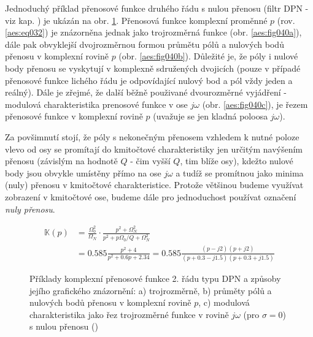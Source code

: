         Jednoduchý příklad přenosové funkce druhého řádu s nulou přenosu (filtr DPN - viz kap.
        ) je ukázán na obr. \ref{aes:fig040}. Přenosová funkce
        komplexní proměnné \(p\) (rov. \ref{aes:eq032}) je znázorněna jednak jako trojrozměrná
        funkce (obr. \ref{aes:fig040a}), dále pak obvyklejší dvojrozměrnou formou průmětu pólů a
        nulových bodů přenosu v komplexní rovině \(p\) (obr. \ref{aes:fig040b}). Důležité je, že
        póly i nulové body přenosu se vyskytují v komplexně sdružených dvojicích (pouze v případé
        přenosové funkce lichého řádu je odpovídající nulový bod a pól vždy jeden a reálný). Dále je
        zřejmé, že další běžně použivané dvourozměrné vyjádření - modulová charakteristika prenosové
        funkce v ose \(j\omega\) (obr. \ref{aes:fig040c}), je řezem přenosové funkce v komplexní
        rovině \(p\) (uvažuje se jen kladná poloosa \(j\omega\)).        
        
        Za povšimnutí stojí, že póly s nekonečným přenosem vzhledem k nutné poloze vlevo od osy se
        promítají do kmitočtové charakteristiky jen určitým navýšením přenosu (závislým na hodnotě
        \(Q\) - čim vyšší \(Q\), tim blíže osy), kdežto nulové body jsou obvykle umístěny přímo na
        ose \(j\omega\) a tudíž se promítnou jako minima (nuly) přenosu v kmitočtové
        charakteristice. Protože většinou budeme využívat zobrazení v kmitočtové ose, budeme dále
        pro jednoduchost používat označení \emph{nuly přenosu}. 

        \begin{align}\label{aes:eq035}
          \mathbb{K}(p) 
            &= \frac{\Omega_0^2}{\Omega_N}\cdot
               \frac{p^2 + \Omega_N^2}{p^2 + p\Omega_0/Q + \Omega_N^2}     \nonumber \\
            &=\num{0.585}\frac{p^2 + 4}{p^2 + \num{0.6}p + \num{2.34}}
             =\num{0.585}\frac{(p-j2)(p+j2)}{(p+\num{0.3}-j\num{1.5})(p+\num{0.3}+j\num{1.5})}            
        \end{align}

        \begin{figure}[ht!]
          \centering  
          \caption{Příklady komplexní přenosové funkce 2. řádu typu DPN a způsoby jejího grafického
                  znázornění: a) trojrozměrně, b) průměty pólů a nulových bodů přenosu v komplexní
                  rovině \(p\), c) modulová charakteristika jako řez trojrozměrné funkce v rovině
                  \(j\omega\) (pro \(\sigma = 0\)) s nulou přenosu
                  (\cite[s.~40]{HajekSedlacek2002})}
          \label{aes:fig040}
        \end{figure}

